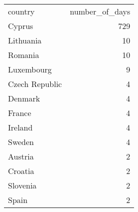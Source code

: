 \begin{tabular}{lr}
country & number_of_days \\
Cyprus & 729 \\
Lithuania & 10 \\
Romania & 10 \\
Luxembourg & 9 \\
Czech Republic & 4 \\
Denmark & 4 \\
France & 4 \\
Ireland & 4 \\
Sweden & 4 \\
Austria & 2 \\
Croatia & 2 \\
Slovenia & 2 \\
Spain & 2 \\
\end{tabular}
